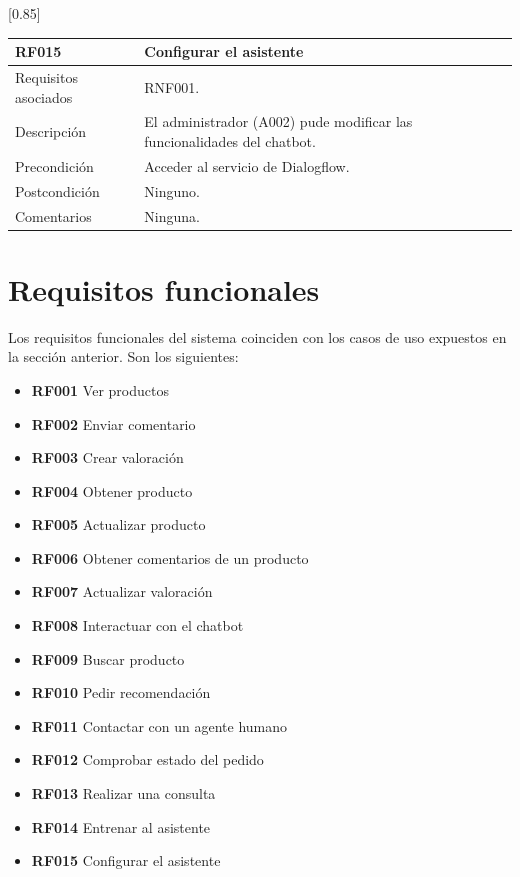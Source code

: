 \begin{table}[htbp]
  \centering
  \scalebox{0.85}[0.85] {
    \begin{tabular}{l p{32.145em}}
    \toprule
    \textbf{RF015} & \textbf{Configurar el asistente} \\
    \midrule
    Requisitos asociados & RNF001. \\
    Descripción & El administrador (A002) pude modificar las funcionalidades del chatbot. \\
    Precondición & Acceder al servicio de Dialogflow. \\
    Postcondición & Ninguno. \\
    Comentarios & Ninguna. \\
    \midrule
    \end{tabular}%
  }
  \label{tab:rf015}
\end{table}%

\newpage
\section{Requisitos funcionales}

Los requisitos funcionales del sistema coinciden con los casos de uso expuestos en la sección anterior. Son los siguientes:

\begin{itemize}
    \item \textbf{RF001} Ver productos
    \item \textbf{RF002} Enviar comentario
    \item \textbf{RF003} Crear valoración
    \item \textbf{RF004} Obtener producto
    \item \textbf{RF005} Actualizar producto
    \item \textbf{RF006} Obtener comentarios de un producto
    \item \textbf{RF007} Actualizar valoración
    \item \textbf{RF008} Interactuar con el chatbot
    \item \textbf{RF009} Buscar producto
    \item \textbf{RF010} Pedir recomendación
    \item \textbf{RF011} Contactar con un agente humano
    \item \textbf{RF012} Comprobar estado del pedido
    \item \textbf{RF013} Realizar una consulta
    \item \textbf{RF014} Entrenar al asistente
    \item \textbf{RF015} Configurar el asistente
    
\end{itemize}


